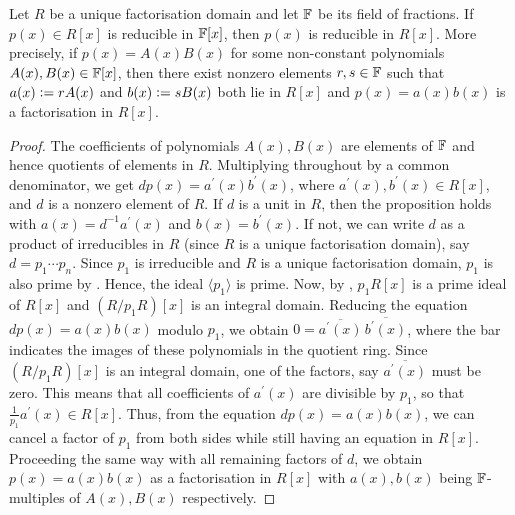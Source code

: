 \begin{prop} \label{prop:gauss-lemma}
    Let $R$ be a unique factorisation domain and let $\mathbb{F}$ be its field of fractions. If $p(x) \in R[x]$ is reducible in $\mathbb{F}[x]$, then $p(x)$ is reducible in $R[x]$. More precisely, if $p(x) = A(x) B(x)$ for some non-constant polynomials $A(x), B(x) \in \mathbb{F}[x]$, then there exist nonzero elements $r,s \in \mathbb{F}$ such that $a(x) \vcentcolon= rA(x)$ and $b(x) \vcentcolon= sB(x)$ both lie in $R[x]$ and $p(x) = a(x) b(x)$ is a factorisation in $R[x]$. 
\end{prop}
\begin{proof}
    The coefficients of polynomials $A(x), B(x)$ are elements of $\mathbb{F}$ and hence quotients of elements in $R$. Multiplying throughout by a common denominator, we get $dp(x) = a^{\prime}(x) b^{\prime}(x)$, where $a^{\prime}(x), b^{\prime}(x) \in R[x]$, and $d$ is a nonzero element of $R$. If $d$ is a unit in $R$, then the proposition holds with $a(x) = d^{-1} a^{\prime}(x)$ and $b(x) = b^{\prime}(x)$. If not, we can write $d$ as a product of irreducibles in $R$ (since $R$ is a unique factorisation domain), say $d = p_1 \cdots p_n$. Since $p_1$ is irreducible and $R$ is a unique factorisation domain, $p_1$ is also prime by . Hence, the ideal $\langle p_1 \rangle$ is prime. Now, by , $p_1 R[x]$ is a prime ideal of $R[x]$ and $(R/p_1R)[x]$ is an integral domain. Reducing the equation $dp(x) = a(x)b(x)$ modulo $p_1$, we obtain $0 = \overline{a^{\prime}(x)} \,  \overline{b^{\prime}(x)}$, where the bar indicates the images of these polynomials in the quotient ring. Since $(R/p_1R)[x]$ is an integral domain, one of the factors, say $\overline{a^{\prime}(x)}$ must be zero. This means that all coefficients of $a^{\prime}(x)$ are divisible by $p_1$, so that $\frac{1}{p_1} a^{\prime}(x) \in R[x]$. Thus, from the equation $dp(x) = a(x) b(x)$, we can cancel a factor of $p_1$ from both sides while still having an equation in $R[x]$. Proceeding the same way with all remaining factors of $d$, we obtain $p(x) = a(x) b(x)$ as a factorisation in $R[x]$ with $a(x), b(x)$ being $\mathbb{F}$-multiples of $A(x), B(x)$ respectively.
\end{proof}

